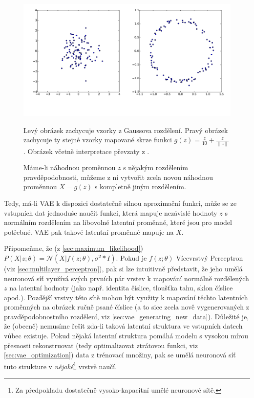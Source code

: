 \begin{figure}[H]
    \includegraphics[width=\textwidth]{img/latent_variable_ring_structure.png}
    \caption{Máme-li náhodnou proměnnou $z$ s nějakým rozdělením pravděpodobnosti, můžeme z ní vytvořit zcela novou náhodnou proměnnou $X = g(z)$ s kompletně jiným rozdělením.}
    Levý obrázek zachycuje vzorky z Gaussova rozdělení. Pravý obrázek zachycuje ty stejné vzorky mapované skrze funkci $g(z) = \frac{z}{10} + \frac{z}{\| z \|}$.
    Obrázek včetně interpretace převzaty z \cite{Doersch2021}.
    \label{fig:latent_variable_ring_structure}
\end{figure}

Tedy, má-li VAE k dispozici dostatečně silnou aproximační funkci, může se ze vstupních dat jednoduše naučit funkci, která mapuje nezávislé hodnoty $z$ s normálním rozdělením na libovolné latentní proměnné, které jsou pro model potřebné.
VAE pak takové latentní proměnné mapuje na $X$.   \cite{Doersch2021}

Připomeňme, že (z \autoref{sec:maximum_likelihood}) $P(X|z;\theta) = \mathcal{N}(X|f(z;\theta), \sigma^2 * I)$.
Pokud je $f(z;\theta)$ Vícevrstvý Perceptron (viz \autoref{sec:multilayer_perceptron}), pak si lze intuitivně představit, že jeho umělá neuronová síť využívá svých prvních pár vrstev k mapování normálně rozdělených $z$ na latentní hodnoty (jako např. identita číslice, tloušťka tahu, sklon číslice apod.).
Pozdější vrstvy této sítě mohou být využity k mapování těchto latentních proměnných na obrázek ručně psané číslice (a to sice zcela nově vygenerovaných z pravděpodobnostního rozdělení, viz \autoref{sec:vae_generating_new_data}).
Důležité je, že (obecně) nemusíme řešit zda-li taková latentní struktura ve vstupních datech vůbec existuje.
Pokud nějaká latentní struktura pomáhá modelu s vysokou mírou přesnosti rekonstruovat (tedy optimalizovat ztrátovou funkci, viz \autoref{sec:vae_optimization}) data z trénovací množiny, pak se umělá neuronová síť tuto strukture v \emph{nějaké}\footnote{Za předpokladu dostatečně vysoko-kapacitní umělé neuronové sítě.} vrstvě naučí. \cite{Doersch2021}



